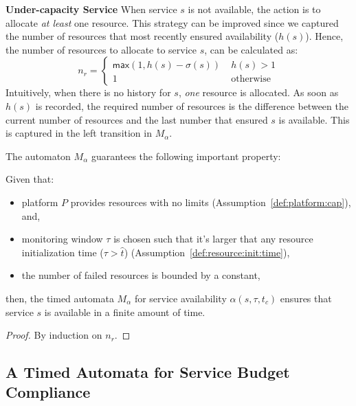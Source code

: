 \textbf{Under-capacity Service}
  When service $s$ is not available, the action is to allocate \emph{at least} one resource.
  This strategy can be improved since we captured the number of resources that
  most recently ensured availability ($h(s)$). Hence, the number of resources to allocate to service $s$, can be calculated as:
  \[
  n_r = 
  \begin{cases}
    \mathsf{max}(1, h(s)-\sigma(s)) &\; h(s) > 1 \\
    1 &\; \text{otherwise}
  \end{cases}
  \]
  Intuitively, when there is no history for $s$, \emph{one} resource is allocated.
  As soon as $h(s)$ is recorded, the required number of resources is the difference between the current number of resources and the last number that ensured $s$ is available.
  This is captured in the left transition in $M_\alpha$.

The automaton $M_\alpha$ guarantees the following important property:
% 

\begin{defn}
\label{thm:service:avail:conv}
Given that: 
\begin{itemize}
  \item platform $P$ provides resources with no limits (Assumption~\ref{def:platform:cap}), and,
  \item monitoring window $\tau$ is chosen such that it's larger that any resource initialization time ($\tau > \hat{t}$) (Assumption~\ref{def:resource:init:time}), 
  \item the number of failed resources
  is bounded by a constant, 
\end{itemize}
then, the timed automata $M_\alpha$ for service availability $\alpha(s,\tau,t_c)$ ensures that service $s$ is available in a finite amount of time.
\end{defn}

\begin{proof}%
By induction on $n_r$.
\end{proof} %

\subsection{A Timed Automata for Service Budget Compliance}
\label{sec:automata:budget}

